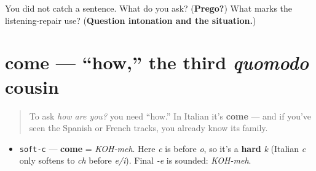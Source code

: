 \begin{tcolorbox}[breakable,colback=teal!4,colframe=teal!35!black,title={Before you move on}]
You did not catch a sentence. What do you ask? (\textbf{Prego?}) What marks the listening-repair use? (\textbf{Question intonation and the situation.})
\end{tcolorbox}
\section[come]{come — \textquotedblleft{}how,\textquotedblright{} the third \emph{quomodo} cousin}

\label{lesson:IT-C02-come}



\begin{quote}
To ask \emph{how are you?} you need \textquotedblleft{}how.\textquotedblright{} In Italian it's \textbf{come} — and if you've seen the Spanish or French tracks, you already know its family.
\end{quote}

\begin{sounds}
\begin{itemize}
\raggedright
  \item \texttt{soft-c} — \textbf{come} = \emph{KOH-meh}. Here \emph{c} is before \emph{o}, so it's a \textbf{hard} \emph{k} (Italian \emph{c} only softens to \emph{ch} before \emph{e/i}). Final \emph{-e} is sounded: \emph{KOH-meh}.
\end{itemize}
\end{sounds}

